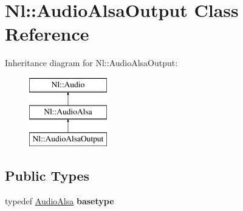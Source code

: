 \hypertarget{classNl_1_1AudioAlsaOutput}{\section{Nl\-:\-:Audio\-Alsa\-Output Class Reference}
\label{classNl_1_1AudioAlsaOutput}
}
Inheritance diagram for Nl\-:\-:Audio\-Alsa\-Output\-:\begin{figure}[H]
\begin{center}
\leavevmode
\includegraphics[height=3.000000cm]{classNl_1_1AudioAlsaOutput}
\end{center}
\end{figure}
\subsection*{Public Types}
\begin{DoxyCompactItemize}
\item 
\hypertarget{classNl_1_1AudioAlsaOutput_abd57cd3efbb62397d017dc0eff54da3e}{typedef \hyperlink{classNl_1_1AudioAlsa}{Audio\-Alsa} {\bfseries basetype}}\label{classNl_1_1AudioAlsaOutput_abd57cd3efbb62397d017dc0eff54da3e}

\end{DoxyCompactItemize}
